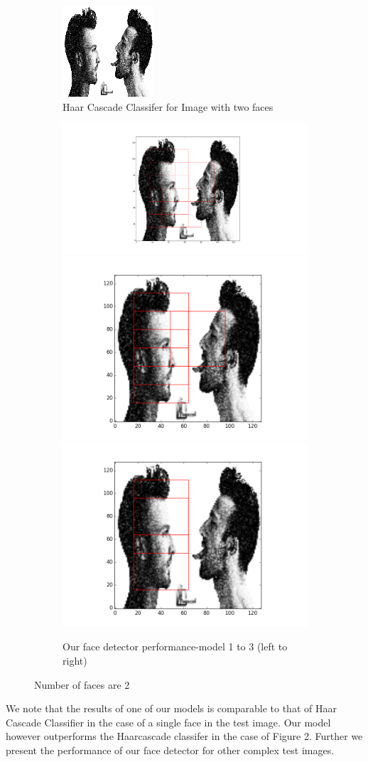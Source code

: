 \documentclass{article}
\begin{document}
\begin{figure}[h]
  \begin{subfigure}{\linewidth}
  \centering
  \includegraphics[width=.3\linewidth]{twohaar.png}\hfill
  \caption{Haar Cascade Classifer for Image with two faces}
  \end{subfigure}\par\medskip
  \begin{subfigure}{\linewidth}
  \includegraphics[width=.3\linewidth]{two83.png}\hfill
  \includegraphics[width=.3\linewidth]{two91.png}\hfill
  \includegraphics[width=.3\linewidth]{two94.png}
  \caption{Our face detector performance-model 1 to 3 (left to right)}
  \end{subfigure}\par\medskip
  \caption{Number of faces are 2}
\end{figure}
We note that the results of one of our models is comparable to that of Haar Cascade Classifier in the case of a single face in the test image. Our model however outperforms the Haarcascade classifer in the case of Figure 2. Further we present the performance of our face detector for other complex test images.
\end{document}

